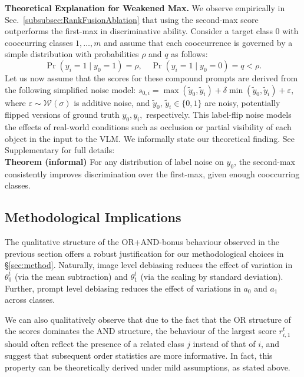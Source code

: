 \noindent \textbf{Theoretical Explanation for Weakened Max.}
We observe empirically in Sec.~\ref{subsubsec:RankFusionAblation} that using the second-max score outperforms the first-max in discriminative ability. %
Consider a target class \(0\) with cooccurring classes \(1, \dots, m\) and assume that each cooccurrence is governed by a simple distribution with probabilities \(\rho\) and \(q\) as follows:
\[
    \Pr(y_i = 1 \mid y_0 = 1) = \rho, \quad \Pr(y_i = 1 \mid y_0 = 0) = q < \rho.
\]
Let us now assume that the scores for these compound prompts are derived from the following simplified noise model:
$s_{0,i} = \max(\tilde{y}_0, \tilde{y}_i) + \delta \min(\tilde{y}_0, \tilde{y}_i) + \varepsilon,$
where \(\varepsilon \sim \mathcal{W}(\sigma)\) is additive noise, and $\tilde{y}_0,\, \tilde{y}_i \in \{0,1\}$ are noisy, potentially flipped versions of ground truth $y_0, y_i,$  respectively. This label-flip noise models the effects of real-world conditions such as occlusion or partial visibility of each object in the input to the VLM. We informally state our theoretical finding. See Supplementary for full details:\\
\textbf{Theorem (informal)} For any distribution of label noise on \(y_0\), the second-max consistently improves discrimination over the first-max, given enough cooccurring classes.
\subsection{Methodological Implications}

The qualitative structure of the OR+AND-bonus behaviour observed in the previous section offers a robust justification for our methodological choices in \S\ref{sec:method}. Naturally, image level debiasing reduces the effect of variation in $\theta_0^t$ (via the mean subtraction) and $\theta_1^t$ (via the scaling by standard deviation). Further, prompt level debiasing reduces the effect of variations in $a_0$ and $a_1$ across classes. 

We can also qualitatively observe that due to the fact that the OR structure of the scores dominates the AND structure, the behaviour of the largest score $r_{i,1}^t$ should often reflect the presence of a related class $j$ instead of that of $i$, and suggest that subsequent order statistics are more informative. In fact, this property can be theoretically derived under mild assumptions, as stated above. 






















